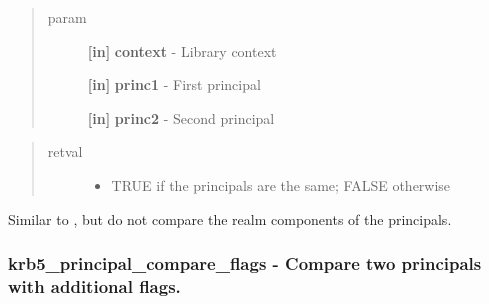 \documentclass[letterpaper,10pt,english]{sphinxmanual}
\begin{document}
\begin{quote}\begin{description}
\item[{param}] \leavevmode
\textbf{{[}in{]}} \textbf{context} - Library context

\textbf{{[}in{]}} \textbf{princ1} - First principal

\textbf{{[}in{]}} \textbf{princ2} - Second principal

\end{description}\end{quote}
\begin{quote}\begin{description}
\item[{retval}] \leavevmode\begin{itemize}
\item {} 
TRUE   if the principals are the same; FALSE otherwise

\end{itemize}

\end{description}\end{quote}

Similar to {\hyperref[appdev/refs/api/krb5_principal_compare:c.krb5_principal_compare]{}} , but do not compare the realm components of the principals.


\subsubsection{krb5\_principal\_compare\_flags -  Compare two principals with additional flags.}
\label{appdev/refs/api/krb5_principal_compare_flags:krb5-principal-compare-flags-compare-two-principals-with-additional-flags}\label{appdev/refs/api/krb5_principal_compare_flags::doc}

\begin{fulllineitems}
\label{appdev/refs/api/krb5_principal_compare_flags:c.krb5_principal_compare_flags}
\end{fulllineitems}
\end{document}
